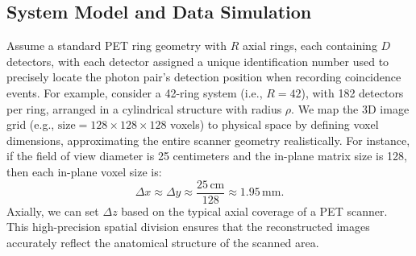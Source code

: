 \documentclass[
reprint,
superscriptaddress,
nofootinbib,
amsmath,amssymb,
aps,
prd,
]{revtex4-2}
\begin{document}

\subsection{System Model and Data Simulation}
Assume a standard PET ring geometry with \(R\) axial rings, each containing \(D\) detectors, with each detector assigned a unique identification number used to precisely locate the photon pair's detection position when recording coincidence events. For example, consider a 42-ring system (i.e., \(R=42\)), with 182 detectors per ring, arranged in a cylindrical structure with radius \(\rho\). We map the 3D image grid (e.g., \(\text{size}=128\times128\times128\) voxels) to physical space by defining voxel dimensions, approximating the entire scanner geometry realistically. For instance, if the field of view diameter is 25 centimeters and the in-plane matrix size is 128, then each in-plane voxel size is:
\begin{equation}
\Delta x \approx \Delta y \approx \frac{25\,\text{cm}}{128} \approx 1.95\,\text{mm}.
\end{equation}
Axially, we can set \(\Delta z\) based on the typical axial coverage of a PET scanner. This high-precision spatial division ensures that the reconstructed images accurately reflect the anatomical structure of the scanned area.
\end{document}
